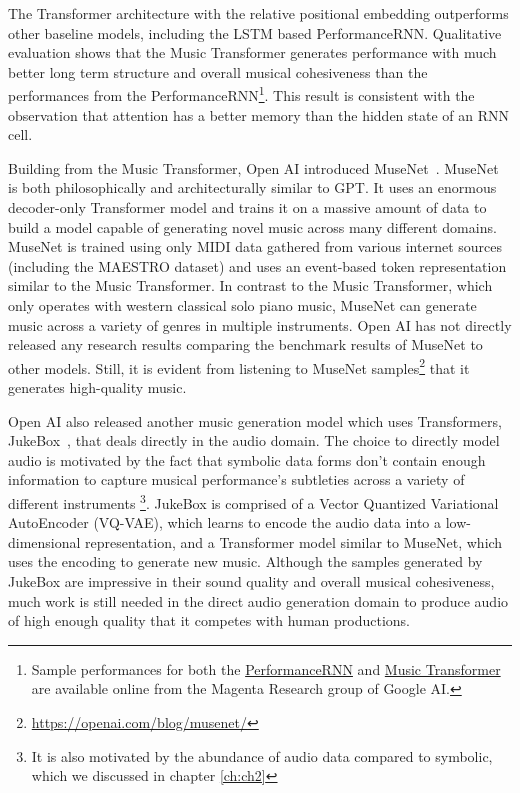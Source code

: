 The Transformer architecture with the relative positional embedding outperforms other baseline models, including the LSTM based PerformanceRNN. Qualitative evaluation shows that the Music Transformer generates performance with much better long term structure and overall musical cohesiveness than the performances from the PerformanceRNN\footnote{Sample performances for both the \href{https://magenta.tensorflow.org/performance-rnn}{PerformanceRNN} and \href{https://magenta.tensorflow.org/music-transformer}{Music Transformer} are  available online from the Magenta Research group of Google AI.}. This result is consistent with the observation that attention has a better memory than the hidden state of an RNN cell. 

Building from the Music Transformer, Open AI introduced MuseNet~\cite{payne_2020}. MuseNet is both philosophically and architecturally similar to GPT. It uses an enormous decoder-only Transformer model and trains it on a massive amount of data to build a model capable of generating novel music across many different domains. MuseNet is trained using only MIDI data gathered from various internet sources (including the MAESTRO dataset) and uses an event-based token representation similar to the Music Transformer. In contrast to the Music Transformer, which only operates with western classical solo piano music, MuseNet can generate music across a variety of genres in multiple instruments. Open AI has not directly released any research results comparing the benchmark results of MuseNet to other models. Still, it is evident from listening to MuseNet samples\footnote{\url{https://openai.com/blog/musenet/}} that it generates high-quality music. 

Open AI also released another music generation model which uses Transformers, JukeBox~\cite{dhariwal2020jukebox}, that deals directly in the audio domain. The choice to directly model audio is motivated by the fact that symbolic data forms don't contain enough information to capture musical performance's subtleties across a variety of different instruments%
\footnote{It is also motivated by the abundance of audio data compared to symbolic, which we discussed in chapter \ref{ch:ch2}}. JukeBox is comprised of a Vector Quantized Variational AutoEncoder (VQ-VAE), which learns to encode the audio data into a low-dimensional representation, and a Transformer model similar to MuseNet, which uses the encoding to generate new music. Although the samples generated by JukeBox are impressive in their sound quality and overall musical cohesiveness, much work is still needed in the direct audio generation domain to produce audio of high enough quality that it competes with human productions. 



